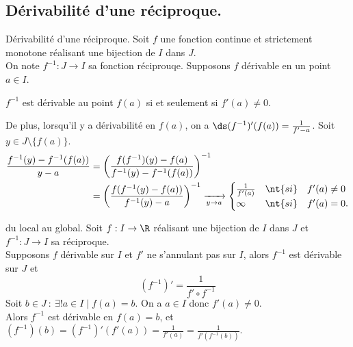 \documentclass[11pt]{article}
\begin{document}
\pagebreak

\subsection{Dérivabilité d'une réciproque.}

\begin{thm}{Dérivabilité d'une réciproque.}{}
    Soit $f$ une fonction continue et strictement monotone réalisant une bijection de $I$ dans $J$.\\
    On note $f^{-1}:J\to I$ sa fonction réciprouqe. Supposons $f$ dérivable en un point $a\in I$.
    \begin{center}
        $f^{-1}$ est dérivable au point $f(a)$ \quad si et seulement si \quad $f'(a)\neq0$.
    \end{center}
    De plus, lorsqu'il y a dérivabilité en $f(a)$, on a $\ds(f^{-1})'(f(a))=\frac{1}{f'-a}$.
    \tcblower
    Soit $y\in J\setminus\{f(a)\}$.
    \begin{align*}
        \frac{f^{-1}(y)-f^{-1}(f(a))}{y-a}&=\left( \frac{f(f^{-1})(y)-f(a)}{f^{-1}(y)-f^{-1}(f(a))} \right)^{-1}\\
        &=\left( \frac{f(f^{-1}(y)-f(a))}{f^{-1}(y)-a} \right)^{-1}\xrightarrow[y\to a]{}\begin{cases}
            \frac{1}{f'(a)} &\nt{si} \quad f'(a)\neq0\\
            \infty &\nt{si} \quad f'(a)=0.
        \end{cases}
    \end{align*}
\end{thm}

\begin{corr}{du local au global.}{}
    Soit $f:I\to\R$ réalisant une bijection de $I$ dans $J$ et $f^{-1}:J\to I$ sa réciproque.\\
    Supposons $f$ dérivable sur $I$ et $f'$ ne s'annulant pas sur $I$, alors $f^{-1}$ est dérivable sur $J$ et
    \begin{equation*}
        (f^{-1})'=\frac{1}{f'\circ f^{-1}}
    \end{equation*}
    \tcblower
    Soit $b\in J ~:~ \exists!a\in I \mid f(a)=b$. On a $a\in I$ donc $f'(a)\neq0$.\\
    Alors $f^{-1}$ est dérivable en $f(a)=b$, et $(f^{-1})(b)=(f^{-1})'(f'(a))=\frac{1}{f'(a)}=\frac{1}{f'(f^{-1}(b))}$.
\end{corr}
\end{document}

